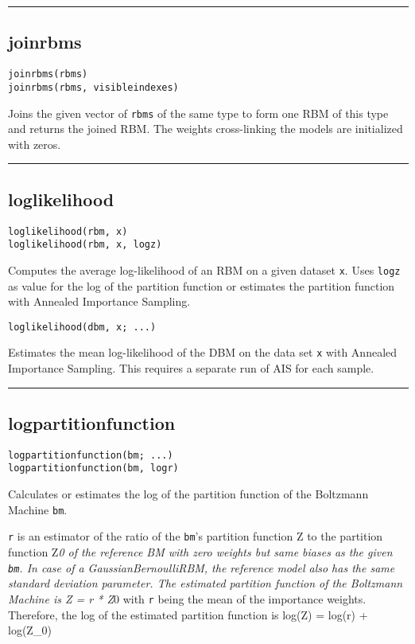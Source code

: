 \noindent\rule{\textwidth}{1pt}
\subsection*{joinrbms}
\begin{verbatim}
joinrbms(rbms)
joinrbms(rbms, visibleindexes)
\end{verbatim}
Joins the given vector of \texttt{rbms} of the same type to form one RBM of this type and returns the joined RBM. The weights cross-linking the models are initialized with zeros.

\noindent\rule{\textwidth}{1pt}
\subsection*{loglikelihood}
\begin{verbatim}
loglikelihood(rbm, x)
loglikelihood(rbm, x, logz)
\end{verbatim}
Computes the average log-likelihood of an RBM on a given dataset \texttt{x}. Uses \texttt{logz} as value for the log of the partition function or estimates the partition function with Annealed Importance Sampling.

\begin{verbatim}
loglikelihood(dbm, x; ...)
\end{verbatim}
Estimates the mean log-likelihood of the DBM on the data set \texttt{x} with Annealed Importance Sampling. This requires a separate run of AIS for each sample.

\noindent\rule{\textwidth}{1pt}
\subsection*{logpartitionfunction}
\begin{verbatim}
logpartitionfunction(bm; ...)
logpartitionfunction(bm, logr)
\end{verbatim}
Calculates or estimates the log of the partition function of the Boltzmann Machine \texttt{bm}.

\texttt{r} is an estimator of the ratio of the \texttt{bm}'s partition function Z to the partition function Z\emph{0 of the reference BM with zero weights but same biases as the given \texttt{bm}. In case of a GaussianBernoulliRBM, the reference model also has the same standard deviation parameter. The estimated partition function of the Boltzmann Machine is Z = r * Z}0 with \texttt{r} being the mean of the importance weights. Therefore, the log of the estimated partition function is log(Z) = log(r) + log(Z\_0)

